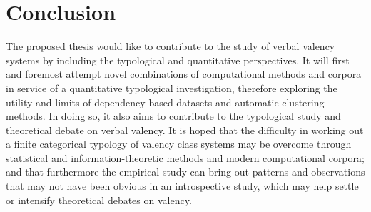 \section{Conclusion}\label{sec:conclusion}

The proposed thesis would like to contribute to the study of verbal valency systems by including the typological and quantitative perspectives. It will first and foremost attempt novel combinations of computational methods and corpora in service of a quantitative typological investigation, therefore exploring the utility and limits of dependency-based datasets and automatic clustering methods. In doing so, it also aims to contribute to the typological study and theoretical debate on verbal valency. It is hoped that the difficulty in working out a finite categorical typology of valency class systems may be overcome through statistical and information-theoretic methods and modern computational corpora; and that furthermore the empirical study can bring out patterns and observations that may not have been obvious in an introspective study, which may help settle or intensify theoretical debates on valency.

